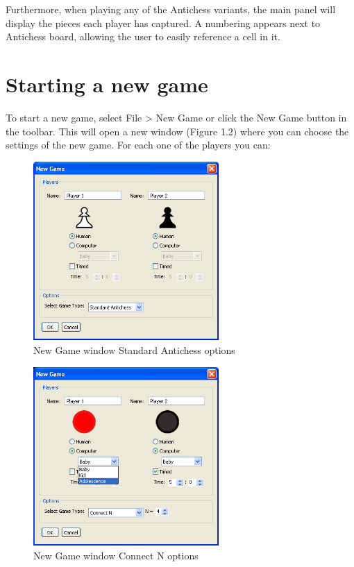 \documentclass{report}
\begin{document}
			Furthermore, when playing any of the Antichess variants, the main panel 
			will display the pieces each player has captured. A numbering appears
			next to Antichess board, allowing the user to easily reference a cell 
			in it.
				
			\section{Starting a new game}
			
			To start a new game, select File > New Game or click the New Game button in
			the toolbar. This will open a new window (Figure 1.2) where you can choose 
			the settings of the new game. For each one of the players you can:
			
				\begin{figure}
					\begin{center}
						\includegraphics[width=200pt]{img/new-game-1.png}
							\caption{New Game window Standard Antichess options}
					\end{center}
				\end{figure}
				
				\begin{figure}
					\begin{center}
						\includegraphics[width=200pt]{img/new-game-2.png}
							\caption{New Game window Connect N options}
					\end{center}
				\end{figure}
				
\end{document}
